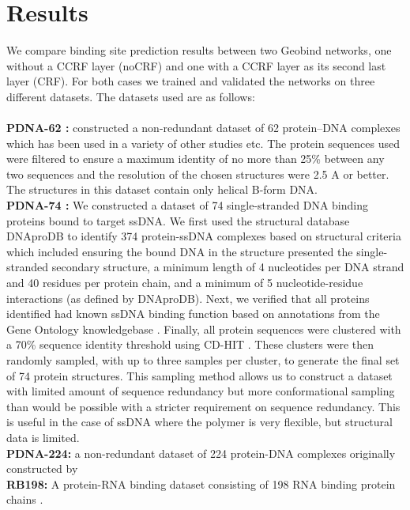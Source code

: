 \section{Results} We compare binding site prediction results between two Geobind networks, one
without a CCRF layer (noCRF) and one with a CCRF layer as its second last layer (CRF). For both
cases we trained and validated the networks on three different datasets. The datasets used are as
follows:\\ \\ \textbf{PDNA-62 :} \citet{ahmad2004analysis} constructed a non-redundant dataset of 62
protein–DNA complexes which has been used in a variety of other studies
\citep{kuznetsov2006transient, wang2006bindn} etc. The protein sequences used were filtered to
ensure a maximum identity of no more than 25\% between any two sequences and the resolution of the
chosen structures were 2.5 A or better. The structures in this dataset contain only helical B-form
DNA.\\ \textbf{PDNA-74 :} We constructed a dataset of 74 single-stranded DNA binding proteins bound
to target ssDNA. We first used the structural database DNAproDB
\citep{sagendorf2017dnaprodb,sagendorf2020dnaprodb} to identify 374 protein-ssDNA complexes based on
structural criteria which included ensuring the bound DNA in the structure presented the
single-stranded secondary structure, a minimum length of 4 nucleotides per DNA strand and 40
residues per protein chain, and a minimum of 5 nucleotide-residue interactions (as defined by
DNAproDB). Next, we verified that all proteins identified had known ssDNA binding function based on
annotations from the Gene Ontology knowledgebase \citep{gene2019gene}.  Finally, all protein
sequences were clustered with a 70\% sequence identity threshold using CD-HIT \citep{li2006cd}.
These clusters were then randomly sampled, with up to three samples per cluster, to generate the
final set of 74 protein structures. This sampling method allows us to construct a dataset with
limited amount of sequence redundancy but more conformational sampling than would be possible with a
stricter requirement on sequence redundancy. This is useful in the case of ssDNA where the polymer
is very flexible, but structural data is limited.\\ \textbf{PDNA-224:} a non-redundant dataset of
        224 protein-DNA complexes originally constructed by \citet{li2013predna}\\ \textbf{RB198: }
        A protein-RNA binding dataset consisting of 198 RNA binding protein chains
        \citep{walia2012protein}.

